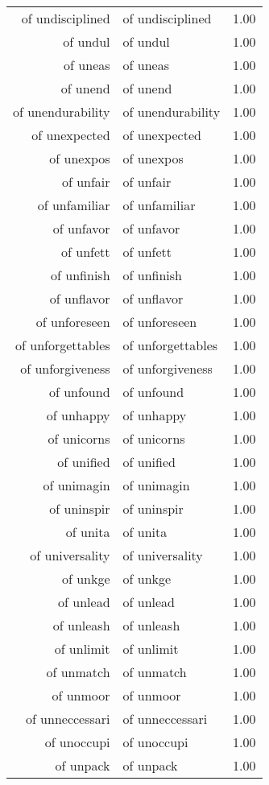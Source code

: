 \begin{table}[ht]
\begin{tabular}{rlr}
  of undisciplined & of undisciplined & 1.00 \\ 
  of undul & of undul & 1.00 \\ 
  of uneas & of uneas & 1.00 \\ 
  of unend & of unend & 1.00 \\ 
  of unendurability & of unendurability & 1.00 \\ 
  of unexpected & of unexpected & 1.00 \\ 
  of unexpos & of unexpos & 1.00 \\ 
  of unfair & of unfair & 1.00 \\ 
  of unfamiliar & of unfamiliar & 1.00 \\ 
  of unfavor & of unfavor & 1.00 \\ 
  of unfett & of unfett & 1.00 \\ 
  of unfinish & of unfinish & 1.00 \\ 
  of unflavor & of unflavor & 1.00 \\ 
  of unforeseen & of unforeseen & 1.00 \\ 
  of unforgettables & of unforgettables & 1.00 \\ 
  of unforgiveness & of unforgiveness & 1.00 \\ 
  of unfound & of unfound & 1.00 \\ 
  of unhappy & of unhappy & 1.00 \\ 
  of unicorns & of unicorns & 1.00 \\ 
  of unified & of unified & 1.00 \\ 
  of unimagin & of unimagin & 1.00 \\ 
  of uninspir & of uninspir & 1.00 \\ 
  of unita & of unita & 1.00 \\ 
  of universality & of universality & 1.00 \\ 
  of unkge & of unkge & 1.00 \\ 
  of unlead & of unlead & 1.00 \\ 
  of unleash & of unleash & 1.00 \\ 
  of unlimit & of unlimit & 1.00 \\ 
  of unmatch & of unmatch & 1.00 \\ 
  of unmoor & of unmoor & 1.00 \\ 
  of unneccessari & of unneccessari & 1.00 \\ 
  of unoccupi & of unoccupi & 1.00 \\ 
  of unpack & of unpack & 1.00 \\ 

\end{tabular}
\end{table}
